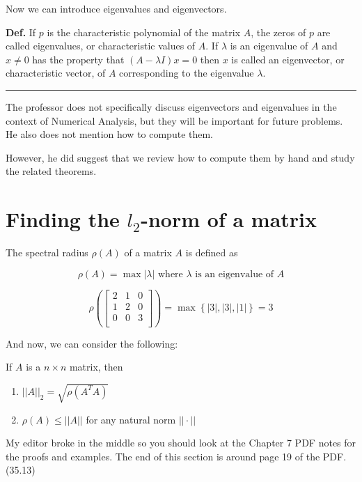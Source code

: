 \documentclass[12pt]{article}
\begin{document}
Now we can introduce eigenvalues and eigenvectors.

\noindent
\hangindent=0.5cm
\textbf{Def.} If $p$ is the characteristic polynomial of the matrix $A$, the
zeros of $p$ are called eigenvalues, or characteristic values of $A$. If $
\lambda$ is an eigenvalue of $A$ and $x\ne 0$ has the property that 
$(A-\lambda I)x = 0$ then $x$ is called an eigenvector, or characteristic
vector, of $A$ corresponding to the eigenvalue $\lambda$.

\noindent\rule{\linewidth}{0.5pt}

The professor does not specifically discuss eigenvectors and eigenvalues in the
context of Numerical Analysis, but they will be important for future problems.
He also does not mention how to compute them.

However, he did suggest that we review how to compute them by hand and study 
the related theorems.

\section{Finding the $l_2$-norm of a matrix}

 The spectral radius $\rho(A)$ of a matrix $A$ is defined as

\begin{equation*}
  \rho(A) = \max \left|\lambda\right| \text{ where } \lambda \text{ is an eigenvalue of } A
\end{equation*}

\ex

\begin{equation*}
  \rho(\begin{bmatrix}
  2 & 1 & 0\\
  1 & 2 & 0\\
  0 & 0 & 3\\
  \end{bmatrix}) = \max \left\{ |3|, |3|, |1| \right\} = 3
\end{equation*}

And now, we can consider the following:

\pagebreak
\thm If $A$ is a $n \times n$ matrix, then

\begin{enumerate}
  \item $||A||_2 = \sqrt{\rho(A^T A)}$
  \item $\rho(A) \leq ||A||$ for any natural norm $||\cdot||$
\end{enumerate}

My editor broke in the middle so you should look at the Chapter 7 PDF notes
for the proofs and examples. The end of this section is around page 19 of 
the PDF. (35.13)
\end{document}
